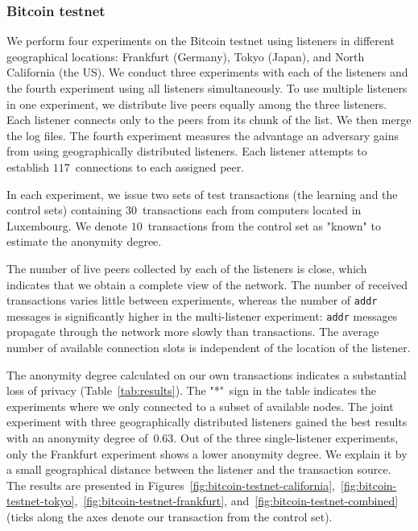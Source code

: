 \subsubsection{Bitcoin testnet}

We perform four experiments on the Bitcoin testnet using listeners in different geographical locations: Frankfurt (Germany), Tokyo (Japan), and North California (the US).
We conduct three experiments with each of the listeners and the fourth experiment using all listeners simultaneously.
To use multiple listeners in one experiment, we distribute live peers equally among the three listeners.
Each listener connects only to the peers from its chunk of the list.
We then merge the log files.
The fourth experiment measures the advantage an adversary gains from using geographically distributed listeners.
Each listener attempts to establish $117$~connections to each assigned peer.

In each experiment, we issue two sets of test transactions (the learning and the control sets) containing $30$~transactions each from computers located in Luxembourg.
We denote $10$~transactions from the control set as "known" to estimate the anonymity degree.

The number of live peers collected by each of the listeners is close, which indicates that we obtain a complete view of the network.
The number of received transactions varies little between experiments, whereas the number of \texttt{addr} messages is significantly higher in the multi-listener experiment: \texttt{addr} messages propagate through the network more slowly than transactions.
The average number of available connection slots is independent of the location of the listener.

The anonymity degree calculated on our own transactions indicates a substantial loss of privacy (Table~\ref{tab:results}).
The "*"~sign in the table indicates the experiments where we only connected to a subset of available nodes.
The joint experiment with three geographically distributed listeners gained the best results with an anonymity degree of~$0.63$.
Out of the three single-listener experiments, only the Frankfurt experiment shows a lower anonymity degree.
We explain it by a small geographical distance between the listener and the transaction source.
The results are presented in Figures~\ref{fig:bitcoin-testnet-california},~\ref{fig:bitcoin-testnet-tokyo},~\ref{fig:bitcoin-testnet-frankfurt}, and~\ref{fig:bitcoin-testnet-combined} (ticks along the axes denote our transaction from the control set).


